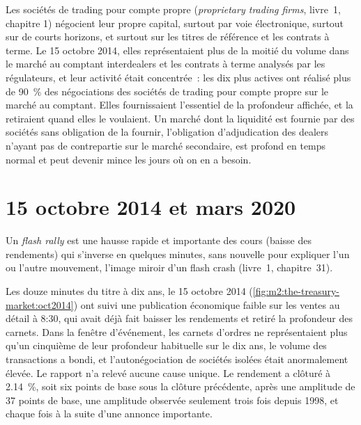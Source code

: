 Les sociétés de trading pour compte propre (\emph{proprietary trading firms}, livre~1,
chapitre 1) négocient leur propre capital, surtout par voie électronique, surtout sur de courts
horizons, et surtout sur les titres de référence et les contrats à terme. Le 15
octobre 2014, elles représentaient plus de la moitié du volume dans le
marché au comptant interdealers et les contrats à terme analysés par les régulateurs, et
leur activité était concentrée~: les dix plus actives ont réalisé plus de 90~\% des
négociations des sociétés de trading pour compte propre sur le marché au comptant. Elles fournissaient l'essentiel
de la profondeur affichée, et la retiraient quand elles le voulaient. Un marché dont la
liquidité est fournie par des sociétés sans obligation de la fournir, l'obligation d'adjudication des
dealers n'ayant pas de contrepartie sur le marché secondaire, est profond en temps normal
et peut devenir mince les jours où on en a besoin.

\section{15 octobre 2014 et mars 2020}

\begin{definition}\label{def:m2:the-treasury-market:flash}
Un \emph{flash rally} est une hausse rapide et importante des cours (baisse
des rendements) qui s'inverse en quelques minutes, sans nouvelle pour expliquer l'un ou l'autre mouvement,
l'image miroir d'un flash crash (livre~1, chapitre~31).
\end{definition}

Les douze minutes du titre à dix ans, le 15 octobre 2014
(\cref{fig:m2:the-treasury-market:oct2014}) ont suivi une publication économique faible sur les ventes au détail à 8:30,
qui avait déjà fait baisser les rendements et retiré la profondeur des carnets. Dans la fenêtre
d'événement, les carnets d'ordres ne représentaient plus qu'un cinquième de leur profondeur habituelle
sur le dix ans, le volume des transactions a bondi, et l'autonégociation de sociétés isolées
était anormalement élevée. Le rapport n'a relevé aucune cause unique. Le rendement a clôturé à
2.14~\%, soit six points de base sous la clôture précédente, après une amplitude de 37
points de base, une amplitude observée seulement trois fois depuis 1998, et chaque fois à la suite
d'une annonce importante.

